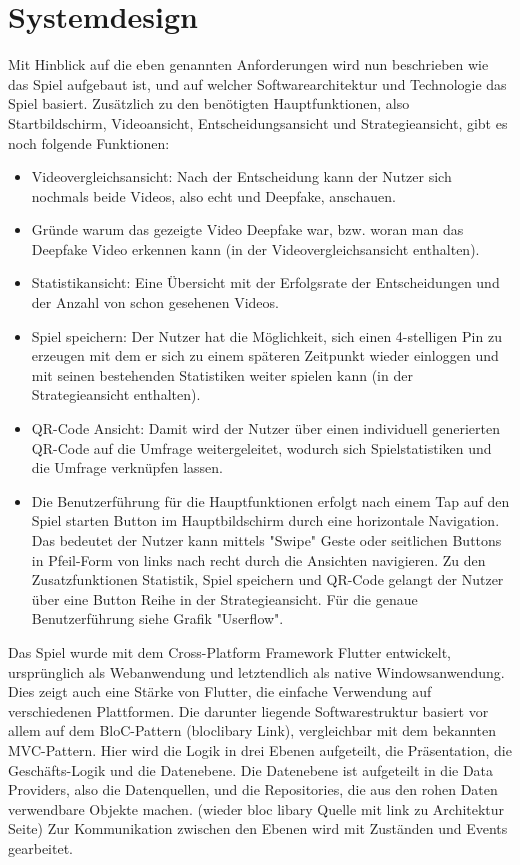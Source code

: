 \section{Systemdesign}
Mit Hinblick auf die eben genannten Anforderungen wird nun beschrieben wie das Spiel aufgebaut ist, 
und auf welcher Softwarearchitektur und Technologie das Spiel basiert.
Zusätzlich zu den benötigten Hauptfunktionen, also Startbildschirm, Videoansicht, Entscheidungsansicht und Strategieansicht, gibt es noch folgende Funktionen:
\begin{itemize}
    \item Videovergleichsansicht: Nach der Entscheidung kann der Nutzer sich nochmals beide Videos, also echt und Deepfake, anschauen.
    \item Gründe warum das gezeigte Video Deepfake war, bzw. woran man das Deepfake Video erkennen kann (in der Videovergleichsansicht enthalten).
    \item Statistikansicht: Eine Übersicht mit der Erfolgsrate der Entscheidungen und der Anzahl von schon gesehenen Videos.
    \item Spiel speichern: Der Nutzer hat die Möglichkeit, sich einen 4-stelligen Pin zu erzeugen mit dem er sich zu einem späteren Zeitpunkt wieder einloggen
         und mit seinen bestehenden Statistiken weiter spielen kann (in der Strategieansicht enthalten).
    \item QR-Code Ansicht: Damit wird der Nutzer über einen individuell generierten QR-Code auf die Umfrage weitergeleitet, wodurch sich Spielstatistiken und die Umfrage verknüpfen lassen.
    \item Die Benutzerführung für die Hauptfunktionen erfolgt nach einem Tap auf den Spiel starten Button im Hauptbildschirm durch eine horizontale Navigation. 
        Das bedeutet der Nutzer kann mittels "Swipe" Geste oder seitlichen Buttons in Pfeil-Form von links nach recht durch die Ansichten navigieren. 
        Zu den Zusatzfunktionen Statistik, Spiel speichern und QR-Code gelangt der Nutzer über eine Button Reihe in der Strategieansicht. Für die genaue Benutzerführung siehe Grafik "Userflow".
\end{itemize}
Das Spiel wurde mit dem Cross-Platform Framework Flutter entwickelt, ursprünglich als Webanwendung und letztendlich als native Windowsanwendung. 
Dies zeigt auch eine Stärke von Flutter, die einfache Verwendung auf verschiedenen Plattformen.
Die darunter liegende Softwarestruktur basiert vor allem auf dem BloC-Pattern (bloclibary Link), vergleichbar mit dem bekannten MVC-Pattern. 
Hier wird die Logik in drei Ebenen aufgeteilt, die Präsentation, die Geschäfts-Logik und die Datenebene. 
Die Datenebene ist aufgeteilt in die Data Providers, also die Datenquellen, und die Repositories, die aus den rohen Daten verwendbare Objekte machen. (wieder bloc libary Quelle mit link zu Architektur Seite)
Zur Kommunikation zwischen den Ebenen wird mit Zuständen und Events gearbeitet.
